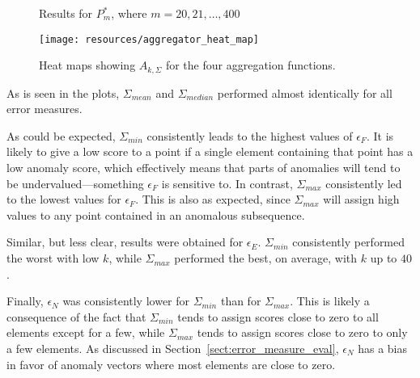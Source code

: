 \begin{figure}
    \centering
    \caption{Results for $P^*_m$, where $m = 20,21,\dots,400$}
\label{fig:m_plot}
\end{figure}
\begin{figure}[!ht]
    \begin{center}
        \texttt{[image: resources/aggregator\_heat\_map]}
    \end{center}
    \caption{\small{Heat maps showing $A_{k, \Sigma}$ for the four aggregation functions.}}
\label{fig:aggregator_heat_map}
\end{figure}

As is seen in the plots, $\Sigma_{mean}$ and $\Sigma_{median}$ performed almost identically for all error measures.

As could be expected, $\Sigma_{min}$ consistently leads to the highest values of $\epsilon_F$. It is likely to give a low score to a point if a single element containing that point has a low anomaly score, which effectively means that parts of anomalies will tend to be undervalued---something $\epsilon_F$ is sensitive to. In contrast, $\Sigma_{max}$ consistently led to the lowest values for $\epsilon_F$. This is also as expected, since $\Sigma_{max}$ will assign high values to any point contained in an anomalous subsequence.

Similar, but less clear, results were obtained for $\epsilon_E$. $\Sigma_{min}$ consistently performed the worst with low $k$, while $\Sigma_{max}$ performed the best, on average, with $k$ up to $40$.

Finally, $\epsilon_N$ was consistently lower for $\Sigma_{min}$ than for $\Sigma_{max}$. This is likely a consequence of the fact that $\Sigma_{min}$ tends to assign scores close to zero to all elements except for a few, while $\Sigma_{max}$ tends to assign scores close to zero to only a few elements. As discussed in Section~\ref{sect:error_measure_eval}, $\epsilon_N$ has a bias in favor of anomaly vectors where most elements are close to zero.

